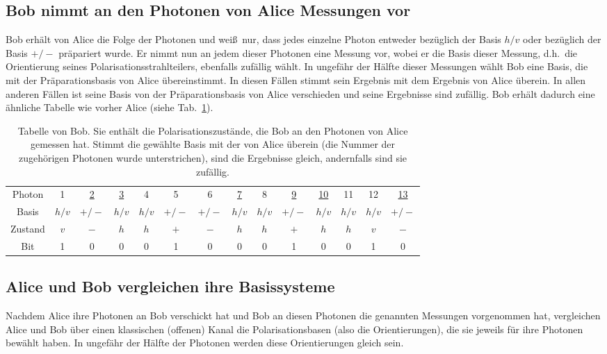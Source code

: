 \subsection{Bob nimmt an den Photonen von Alice Messungen vor}

Bob erh\"alt von Alice die Folge der Photonen und wei\ss\ nur, dass jedes einzelne Photon entweder bez\"uglich
der Basis $h/v$ oder bez\"uglich der Basis $+/-$ pr\"apariert wurde. Er nimmt nun an jedem dieser Photonen eine
Messung vor, wobei er die Basis dieser Messung, d.h.\ die Orientierung seines
Polarisationsstrahlteilers, ebenfalls zuf\"allig w\"ahlt. In ungef\"ahr der H\"alfte dieser Messungen
w\"ahlt Bob eine Basis, die mit der Pr\"aparationsbasis von Alice \"ubereinstimmt. In diesen F\"allen stimmt sein
Ergebnis mit dem Ergebnis von Alice \"uberein. In allen anderen F\"allen ist seine Basis von der
Pr\"aparationsbasis von Alice verschieden und seine Ergebnisse sind zuf\"allig. Bob erh\"alt dadurch eine 
\"ahnliche Tabelle wie vorher Alice (siehe Tab.\ \ref{tab_Bob1}). 
\begin{table}[htb]
\begin{tabular}{c|c|c|c|c|c|c|c|c|c|c|c|c|c}
Photon & 1 & \underline{2} & \underline{3} & 4 & 5 & 6 & \underline{7} & 8 & \underline{9} & 
                \underline{10} & 11 & 12 & \underline{13}  \\
Basis & $h/v$ & $+/-$ & $h/v$ & $h/v$ & $+/-$ & $+/-$ & $h/v$ & $h/v$ & $+/-$ & $h/v$ & $h/v$ & $h/v$ & $+/-$   \\
Zustand & $v$ & $-$ & $h$ & $h$ & $+$ & $-$ & $h$ & $h$ & $+$ & $h$ & $h$ & $v$ & $-$   \\
Bit & 1 & 0 & 0 & 0 & 1 & 0 & 0 & 0 & 1 & 0 & 0 & 1 & 0       
\end{tabular}
\caption{\label{tab_Bob1}%
Tabelle von Bob. Sie enth\"alt die Polarisationszust\"ande, die Bob an den Photonen von Alice gemessen hat. 
Stimmt die gew\"ahlte Basis mit der von Alice \"uberein (die Nummer der zugeh\"origen Photonen wurde
unterstrichen), sind die Ergebnisse gleich, andernfalls sind sie zuf\"allig.}         
\end{table}

\subsection{Alice und Bob vergleichen ihre Basissysteme}

Nachdem Alice ihre Photonen an Bob verschickt hat und Bob an diesen Photonen die genannten
Messungen vorgenommen hat, vergleichen Alice und Bob \"uber einen klassischen (offenen) Kanal die
Polari\-sations\-basen (also die Orientierungen), die sie jeweils f\"ur ihre Photonen bew\"ahlt haben.
In ungef\"ahr der H\"alfte der Photonen werden diese Orientierungen gleich sein. 


